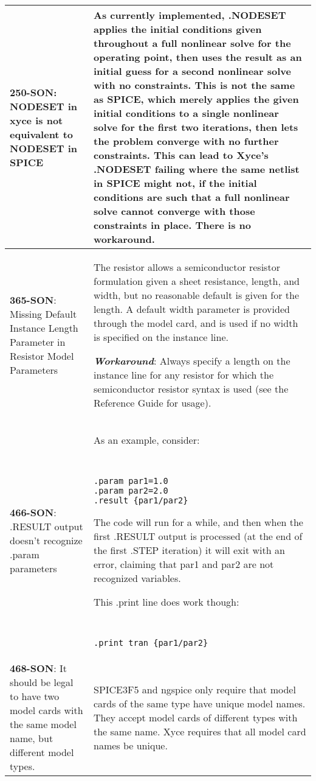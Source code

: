 \begin{longtable}[h] {>{\raggedright\small}m{2in}|>{\raggedright\let\\\tabularnewline\small}m{3.5in}}
\textbf{250-SON}: NODESET in xyce is not equivalent to NODESET in SPICE & As
currently implemented, .NODESET applies the initial conditions given throughout
a full nonlinear solve for the operating point, then uses the result as an
initial guess for a second nonlinear solve with no constraints.  This is not
the same as SPICE, which merely applies the given initial conditions to a
single nonlinear solve for the first two iterations, then lets the problem
converge with no further constraints.  This can lead to Xyce's .NODESET failing
where the same netlist in SPICE might not, if the initial conditions are such
that a full nonlinear solve cannot converge with those constraints in place.
There is no workaround.
\\ \hline


\textbf{365-SON}: Missing Default Instance Length Parameter in Resistor Model
Parameters & The resistor allows a semiconductor resistor formulation given a
sheet resistance, length, and width, but no reasonable default is given for the
length.  A default width parameter is provided through the model card, and is
used if no width is specified on the instance line.

\textbf{\textit{Workaround}}: Always specify a length on the instance line for any
resistor for which the semiconductor resistor syntax is used (see the \Xyce{} Reference Guide for usage).
\\ \hline

\textbf{466-SON}: .RESULT output doesn't recognize .param parameters &  As an
example, consider: 
{\tt
\begin{verbatim}
.param par1=1.0 
.param par2=2.0 
.result {par1/par2} 
\end{verbatim}
}
The code will run for a while, and then when the first .RESULT output is
processed (at the end of the first .STEP iteration) it will exit with an error,
claiming that par1 and par2 are not recognized variables.

This .print line does work though:
{\tt
\begin{verbatim}
.print tran {par1/par2}
\end{verbatim}
}
\\ \hline


\textbf{468-SON}: It should be legal to have two model cards with the same model
name, but different model types. & SPICE3F5 and ngspice only require that
model cards of the same type have unique model names. They accept model cards
of different types with the same name.  Xyce requires that all model card names be unique.
\\ \hline



\end{longtable}
